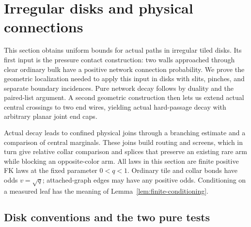 \section{Irregular disks and physical connections}\label{sec:disks}

This section obtains uniform bounds for actual paths in irregular tiled
disks.  Its first input is the pressure contact construction: two walls
approached through clear ordinary bulk have a positive network connection
probability.  We prove the geometric localization needed to apply this
input in disks with slits, pinches, and separate boundary incidences.
Pure network decay follows by duality and the paired-list argument.
A second geometric construction then lets us extend actual central
crossings to two end wires, yielding actual hard-passage decay with
arbitrary planar joint end caps.

Actual decay leads to confined physical joins through a branching
estimate and a comparison of central marginals.  These joins build
routing and screens, which in turn give relative collar comparison
and splices that preserve an existing rare arm while blocking an
opposite-color arm.  All laws in this section are finite positive FK
laws at the fixed parameter $0<q<1$.  Ordinary tile and collar bonds
have odds $v=\sqrt q$; attached-graph edges may have any positive odds.
Conditioning on a measured leaf has the meaning of
Lemma~\ref{lem:finite-conditioning}.

\subsection{Disk conventions and the two pure tests}


